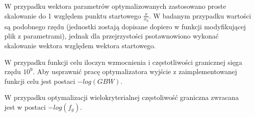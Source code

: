 \documentclass{article}
\begin{document}
W przypadku wektora parametrów optymalizowanych zastosowano proste skalowanie do 1 względem punktu startowego $\frac{x}{x_0}$.
W badanym przypadku wartości są podobnego rzędu (jednostki zostają dopisane dopiero w funkcji modyfikującej plik z parametrami), jednak dla przejrzystości psotawnowiono wykonać
skalowanie wektora względem wektora startowego.

W przypadku funkcji celu iloczyn wzmocnienia i częstotliwości granicznej sięga rzędu $10^9$.
Aby usprawnić pracę optymalizatora wyjście z zaimplementowanej funkcji celu jest postaci $-log(GBW)$.

W przypadku optymalizacji wielokryterialnej częstoliwość graniczna zwracana jest w postaci $-log(f_g)$.








\end{document}

